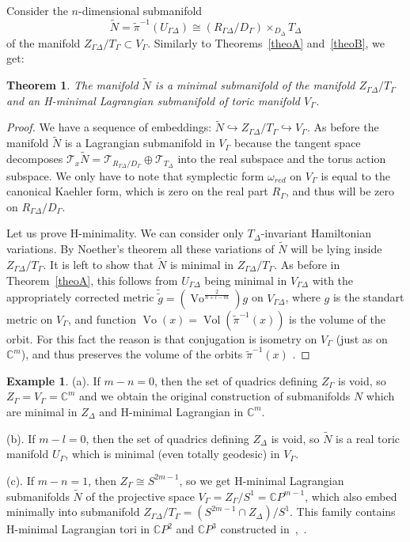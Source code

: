 \documentclass[jsg]{IP_v1_forauthors}
\def\Vo{\mathop{\mathrm{Vo}}}
\def\Vol{\mathop{\mathrm{Vol}}}
\newtheorem{theo}{Theorem}[section]
\theoremstyle{definition}
\numberwithin{equation}{section}
\newtheorem{exam}{Example}
\begin{document}
Consider the $n$-dimensional submanifold 
\begin{equation}
\tilde{N} = \tilde{\pi} ^{-1}(U_{\Gamma \Delta}) \cong (R_{\Gamma \Delta}/D_\Gamma) \times_{D_\Delta} T_\Delta
\end{equation} 
of the manifold $ Z_{\Gamma \Delta}/T_\Gamma  \subset V_\Gamma $. Similarly to Theorems~\ref{theoA} and~\ref{theoB}, we get:
\begin{theo}
The manifold $\tilde{N}$ is a minimal submanifold of the manifold $ Z_{\Gamma \Delta}/T_\Gamma $ and an H-minimal Lagrangian submanifold of toric manifold $V_\Gamma$.
\end{theo}
\begin{proof}
We have a sequence of embeddings: $ \tilde{N} \hookrightarrow Z_{\Gamma \Delta} / T_\Gamma \hookrightarrow V_\Gamma$. As before the manifold $\tilde{N}$ is a Lagrangian submanifold in $V_\Gamma$ because the tangent space decomposes $\mathcal T_x \tilde{N}=\mathcal T_{R_{\Gamma \Delta}/ D_\Gamma} \oplus \mathcal T_{T_\Delta}$ into the real subspace and the torus action subspace. We only have to note that symplectic form $\omega_{red}$ on $V_\Gamma$ is equal to the canonical Kaehler form, which is zero on the real part $R_\Gamma$, and thus will be zero on $R_{\Gamma \Delta}/D_\Gamma$.

Let us prove H-minimality. We can consider only $T_\Delta$-invariant Hamiltonian variations. By Noether's theorem all these variations of $\tilde{N}$ will be lying inside $Z_{\Gamma \Delta} / T_\Gamma$. It is left to show that $\tilde{N}$ is minimal in $Z_{\Gamma \Delta} / T_\Gamma$. As before in Theorem~\ref{theoA}, this follows from $U_{\Gamma \Delta}$ being minimal in $V_{\Gamma \Delta}$ with the appropriately corrected metric $\tilde{ \tilde{g}} =( \Vo ^{ \frac {2} {n+l-m}} )g$ on $V_{\Gamma \Delta}$, where $g$ is the standart metric on $V_\Gamma$, and function $\Vo(x)=\Vol(\tilde{\pi}^{-1}(x) )$ is the volume of the orbit. For this fact the reason is that conjugation is isometry on $V_\Gamma$ (just as on $\mathbb{C}^m$), and thus preserves the volume of the orbits $\tilde{\pi}^{-1}(x)$ . 
\end{proof}
\begin{exam}
(a). If $m-n=0$, then the set of quadrics defining $Z_\Gamma$ is void, so $Z_\Gamma=V_\Gamma={\mathbb C}^m$ and we obtain the original construction of submanifolds $N$ which are minimal in $Z_\Delta$ and H-minimal Lagrangian in ${\mathbb C}^m$.

(b). If $m-l=0$, then the set of quadrics defining $Z_{\Delta}$ is void, so $\tilde{N}$ is a real toric manifold $U_\Gamma$, which is minimal (even totally geodesic) in $V_\Gamma$.

(c). If $m-n=1$, then $Z_\Gamma \cong S^{2m-1}$, so we get H-minimal Lagrangian submanifolds $\tilde{N}$ of the projective space $V_\Gamma=Z_\Gamma / S^1={\mathbb C}P^{m-1}$, which also embed minimally into submanifold $Z_{\Gamma \Delta} / T_\Gamma = (S^{2m-1} \cap Z_\Delta )/ S^1$. This family contains H-minimal Lagrangian tori in $\mathbb{C}P^2$ and $\mathbb{C}P^3$ constructed in~\cite{Mi1},~\cite{MZ}.
\end{exam}
\end{document}
